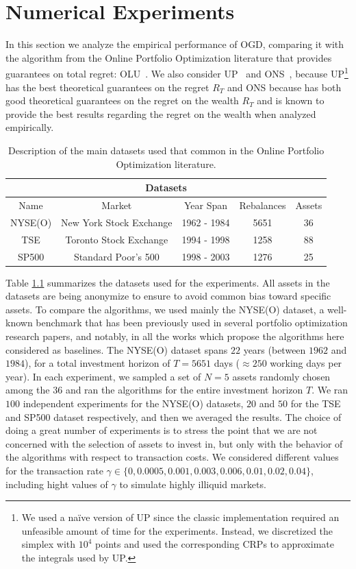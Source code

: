 \chapter{Numerical Experiments} 
\label{ch:experiments}

In this section we analyze the empirical performance of OGD, comparing it with the algorithm from the Online Portfolio Optimization literature that provides guarantees on total regret: OLU~\cite{das2013online}.
We also consider UP~\cite{cover1996universal} and ONS~\cite{agarwal2006algorithms}, because UP\footnote{
We used a na\"ive version of UP since the classic implementation required an unfeasible amount of time for the experiments.
Instead, we discretized the simplex with $10^4$ points and used the corresponding CRPs to approximate the integrals used by UP.} has the best theoretical guarantees on the regret $R_T$ and ONS because has both good theoretical guarantees on the regret on the wealth $R_T$ and is known to provide the best results regarding the regret on the wealth when analyzed empirically.

\begin{table}[ht!]\centering
\begin{tabular}{ |c||c|c|c|c| }
 \hline
 \multicolumn{5}{|c|}{Datasets} \\
 \hline
 Name & Market &Year Span & Rebalances & Assets\\
 \hline
 NYSE(O) & New York Stock Exchange  & 1962 - 1984  &5651&   36\\
 TSE & Toronto Stock Exchange & 1994 - 1998  & 1258   &88\\
 SP500 & Standard Poor's 500 & 1998 - 2003 & 1276&  25\\
 \hline
\end{tabular}
\caption{Description of the main datasets used that common in the Online Portfolio Optimization literature.}\label{tab:dataset}
\end{table}

Table \ref{tab:dataset} summarizes the datasets used for the experiments. All assets in the datasets are being anonymize to ensure to avoid common bias toward specific assets.
To compare the algorithms, we used mainly the NYSE(O) dataset, a well-known benchmark that has been previously used in several portfolio optimization research papers, and notably, in all the works which propose the algorithms here considered as baselines.
The NYSE(O) dataset spans $22$ years (between $1962$ and $1984$), for a total investment horizon of $T = 5651$ days ($\approx250$ working days per year).
In each experiment, we sampled a set of $N=5$ assets randomly chosen among the $36$ and ran the algorithms for the entire investment horizon $T$.
We ran $100$ independent experiments for the NYSE(O) datasets, $20$ and $50$ for the TSE and SP500 dataset respectively, and then we averaged the results. The choice of doing a great number of experiments is to stress the point that we are not concerned with the selection of assets to invest in, but only with the behavior of the algorithms with respect to transaction costs.
We considered different values for the transaction rate $\gamma \in \{ 0, 0.0005, 0.001, 0.003, 0.006, 0.01, 0.02, 0.04 \}$, including hight values of $\gamma$ to simulate highly illiquid markets.

